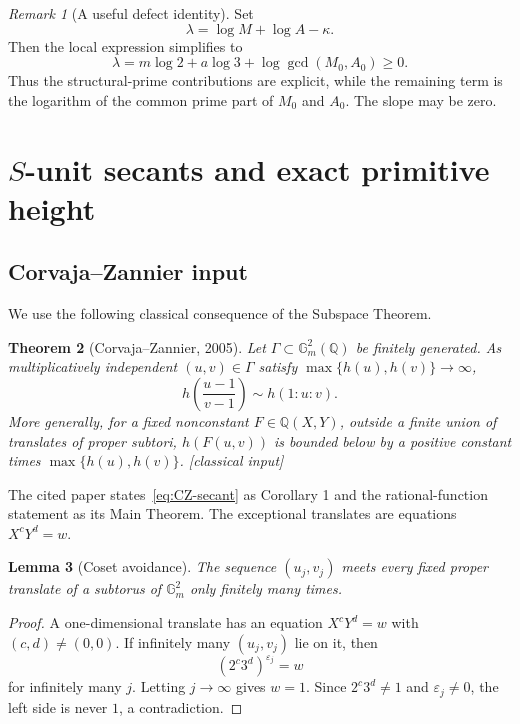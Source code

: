 \documentclass[11pt,oneside]{article}
\newtheorem{theorem}{Theorem}[section]
\newtheorem{lemma}[theorem]{Lemma}
\theoremstyle{definition}
\theoremstyle{remark}
\newtheorem{remark}[theorem]{Remark}
\newcommand{\Q}{\mathbb Q}
\newcommand{\Gm}{\mathbb G_m}
\newcommand{\eps}{\varepsilon}
\newcommand{\classical}{\textcolor{deepblue}{\textsf{[classical input]}}}
\begin{document}
\begin{remark}[A useful defect identity]
Set
\begin{equation}
 \lambda=\log M+\log A-\kappa.
 \label{eq:lambda}
\end{equation}
Then the local expression simplifies to
\begin{equation}
 \lambda=m\log2+a\log3+\log\gcd(M_0,A_0)\ge0.
 \label{eq:lambda-local}
\end{equation}
Thus the structural-prime contributions are explicit, while the remaining term is the
logarithm of the common prime part of $M_0$ and $A_0$.  The slope may be zero.
\end{remark}

\section{\texorpdfstring{$S$}{S}-unit secants and exact primitive height}
\label{sec:secant}

\subsection{Corvaja--Zannier input}

We use the following classical consequence of the Subspace Theorem.

\begin{theorem}[Corvaja--Zannier, 2005]
\label{thm:CZ}
Let $\Gamma\subset\Gm^2(\Q)$ be finitely generated.  As multiplicatively independent
$(u,v)\in\Gamma$ satisfy $\max\{h(u),h(v)\}\to\infty$,
\begin{equation}
 h\!\left(\frac{u-1}{v-1}\right)\sim h(1:u:v).
 \label{eq:CZ-secant}
\end{equation}
More generally, for a fixed nonconstant $F\in\Q(X,Y)$, outside a finite union of translates
of proper subtori, $h(F(u,v))$ is bounded below by a positive constant times
$\max\{h(u),h(v)\}$.
\classical
\end{theorem}

The cited paper states~\eqref{eq:CZ-secant} as Corollary 1 and the rational-function statement
as its Main Theorem.  The exceptional translates are equations $X^cY^d=w$.

\begin{lemma}[Coset avoidance]
\label{lem:coset-avoidance}
The sequence $(u_j,v_j)$ meets every fixed proper translate of a subtorus of $\Gm^2$ only
finitely many times.
\end{lemma}

\begin{proof}
A one-dimensional translate has an equation $X^cY^d=w$ with $(c,d)\ne(0,0)$.  If infinitely
many $(u_j,v_j)$ lie on it, then
\[
 (2^c3^d)^{\eps_j}=w
\]
for infinitely many $j$.  Letting $j\to\infty$ gives $w=1$.  Since $2^c3^d\ne1$ and
$\eps_j\ne0$, the left side is never $1$, a contradiction.
\end{proof}
\end{document}
